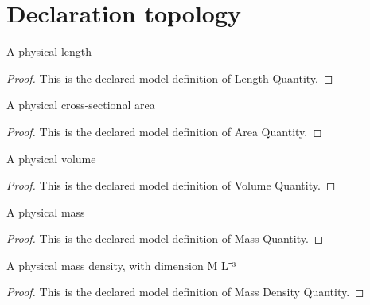 \section{Declaration topology}
\begin{definition}
  \label{def:physics:phyx-mini-0664:phyxminiproblems-problemphyxmini0664-lengthquantity}
  A physical length
\end{definition}
\begin{proof}
  This is the declared model definition of Length Quantity.
\end{proof}
\begin{definition}
  \label{def:physics:phyx-mini-0664:phyxminiproblems-problemphyxmini0664-areaquantity}
  A physical cross-sectional area
\end{definition}
\begin{proof}
  This is the declared model definition of Area Quantity.
\end{proof}
\begin{definition}
  \label{def:physics:phyx-mini-0664:phyxminiproblems-problemphyxmini0664-volumequantity}
  A physical volume
\end{definition}
\begin{proof}
  This is the declared model definition of Volume Quantity.
\end{proof}
\begin{definition}
  \label{def:physics:phyx-mini-0664:phyxminiproblems-problemphyxmini0664-massquantity}
  A physical mass
\end{definition}
\begin{proof}
  This is the declared model definition of Mass Quantity.
\end{proof}
\begin{definition}
  \label{def:physics:phyx-mini-0664:phyxminiproblems-problemphyxmini0664-massdensityquantity}
  A physical mass density, with dimension M L⁻³
\end{definition}
\begin{proof}
  This is the declared model definition of Mass Density Quantity.
\end{proof}

